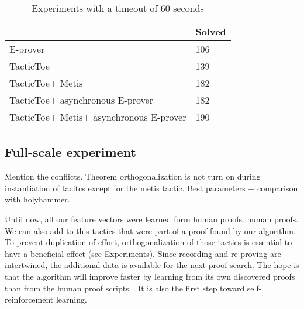 \documentclass[runningheads,a4paper,draft]{svjour3}
\def\eprover{\textsf{E-prover}\xspace}
\def\metis{\textsf{Metis}\xspace}
\def\tactictoe{\textsf{TacticToe}\xspace}
\newcommand{\ra}[1]{\renewcommand{\arraystretch}{#1}}
\begin{document}

\begin{table}[h!]
\centering\ra{1.3}
\small
\begin{tabular}{ll}
\toprule
  & Solved \\
\midrule
   \eprover &  106 \\
   \tactictoe &  139 \\
   \tactictoe + \metis & 182 \\
   \tactictoe + asynchronous \eprover & 182 \\
   \tactictoe + \metis + asynchronous \eprover & 190 \\
  
\bottomrule
\end{tabular}
\caption{Experiments with a timeout of 60 seconds \label{tab:param}}
\end{table}

\subsection{Full-scale experiment}

Mention the conflicts.
Theorem orthogonalization is not turn on during instantiation of tacitcs except 
for the metis tactic.
Best parameters + comparison with holyhammer.




Until now, all our feature vectors were learned form human proofs. 
human proofs. We can also add to this tactics that were part of a proof found 
by our algorithm. To prevent duplication of effort, orthogonalization of those 
tactics is essential to have a beneficial effect (see Experiments).
Since recording and re-proving are intertwined, the 
additional data is available for the next proof search.
The hope is that the algorithm will improve faster by learning from its own 
discovered proofs than from the human proof 
scripts~\cite{DBLP:conf/cade/Urban07}. It is also the first step toward 
self-reinforcement learning.
\end{document}
